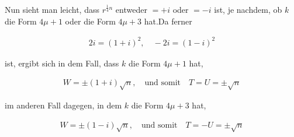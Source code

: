 Nun sieht man leicht, dass $r^{\frac14n}$ entweder $=+i$ oder $=-i$ ist, je nachdem, ob $k$ die Form $4\mu+1$ oder die Form $4\mu+3$ hat.\quad Da ferner

\[
\begin{aligned}
2i=(1+i)^2,\quad -2i=(1-i)^2
\end{aligned}
\]

ist, ergibt sich in dem Fall, dass $k$ die Form $4\mu+1$ hat,

\[
\begin{aligned}
W=\pm(1+i)\surd n,\quad\text{und somit}\quad T=U=\pm\surd n
\end{aligned}
\]

im anderen Fall dagegen, in dem $k$ die Form $4\mu+3$ hat,

\[
\begin{aligned}
W=\pm(1-i)\surd n,\quad\text{und somit}\quad T=-U=\pm\surd n
\end{aligned}
\]
